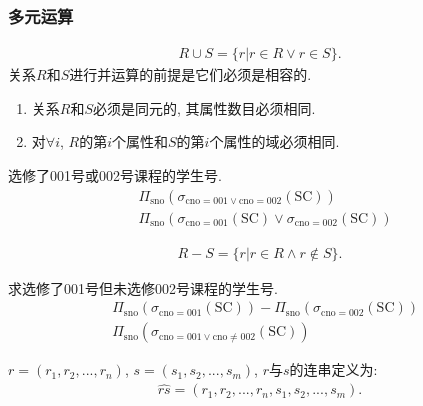 \subsubsection{多元运算}

\begin{definition}[并运算]
\begin{align*}
    R\cup S =\{r|r\in R\lor r \in S\}.
\end{align*}
关系$R$和$S$进行并运算的前提是它们必须是相容的.
\begin{enumerate}
    \item 关系$R$和$S$必须是同元的, 其属性数目必须相同.
    \item 对$\forall i$, $R$的第$i$个属性和$S$的第$i$个属性的域必须相同.
\end{enumerate}
\end{definition}

\begin{example}
选修了001号或002号课程的学生号.
\begin{align*}
    &\Pi_{\text{sno}}(\sigma_{\text{cno}=001\lor \text{cno}=002}(\text{SC})) \\
    &\Pi_{\text{sno}}(\sigma_{\text{cno}=001}(\text{SC})\lor \sigma_{\text{cno}=002}(\text{SC}))
\end{align*}
\end{example}

\begin{definition}[差运算]
\begin{align*}
    R-S =\{r|r\in R\land r \not\in S\}.
\end{align*}
\end{definition}

\begin{example}
求选修了001号但未选修002号课程的学生号.
\begin{align*}
    &\Pi_{\text{sno}}(\sigma_{\text{cno}=001}(\text{SC})) - \Pi_{\text{sno}}(\sigma_{\text{cno}=002}(\text{SC})) \\
   &\Pi_{\text{sno}}(\sigma_{\text{cno}=001\lor \text{cno}\neq 002}(\text{SC}))
\end{align*}
\end{example}

\begin{definition}[连串(Concatenation)]
$r=(r_1,r_2,...,r_n)$, $s=(s_1,s_2,...,s_m)$, $r$与$s$的连串定义为:
\begin{align*}
    \widehat{rs} = (r_1,r_2,...,r_n,s_1,s_2,...,s_m).
\end{align*}
\end{definition}

